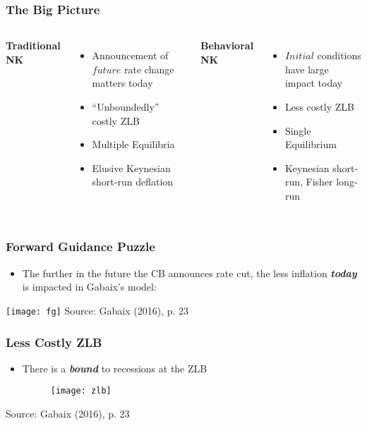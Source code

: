 \documentclass{beamer}
\begin{document}

\begin{frame}
	\frametitle{The Big Picture}
	\begin{columns}[c] 
	\textbf{Traditional NK}
	\begin{itemize}
		\item Announcement of $future$ rate change matters today
		\item ``Unboundedly'' costly ZLB
		\item Multiple Equilibria
		\item Elusive Keynesian short-run deflation
	\end{itemize}

	\textbf{Behavioral NK}
	 \begin{itemize}
		\item $Initial$ conditions have large impact today
		\item Less costly ZLB
		\item Single Equilibrium
		\item Keynesian short-run, Fisher long-run
	\end{itemize}
	\end{columns}
\end{frame}


\begin{frame}
	\frametitle{Forward Guidance Puzzle}
	\begin{itemize}
		\item The further in the future the CB announces rate cut, the less inflation \textit{\textbf{today}} is impacted in Gabaix's model:
	\end{itemize}
	\texttt{[image: fg]}
	{\footnotesize Source: Gabaix (2016), p. 23}
\end{frame}


\begin{frame}
	\frametitle{Less Costly ZLB}
	\begin{itemize}
		\item There is a \textit{\textbf{bound}} to recessions at the ZLB
		\begin{figure}[h]
			\texttt{[image: zlb]}
		\end{figure}
	\end{itemize}	
	{\footnotesize Source: Gabaix (2016), p. 23}
\end{frame}
 
\end{document}
